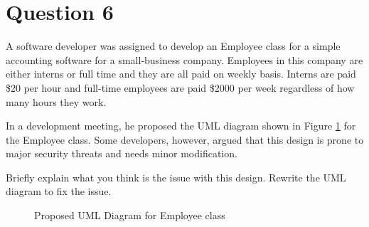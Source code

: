 \documentclass[12pt,letterpaper,twoside]{article}
\begin{document}
\section*{Question 6}

A software developer was assigned to develop an Employee class for a simple accounting software for a small-business company.
Employees in this company are either interns or full time and they are all paid on weekly basis.
Interns are paid \$20 per hour and full-time employees are paid \$2000 per week regardless of how many hours they work.

In a development meeting, he proposed the UML diagram shown in Figure \ref{fig1} for the Employee class.
Some developers, however, argued that this design is prone to major security threats and needs minor modification.

Briefly explain what you think is the issue with this design.
Rewrite the UML diagram to fix the issue.

\begin{figure}[H]
	\centering
	\caption{Proposed UML Diagram for Employee class}\label{fig1}
\end{figure}
\end{document}
